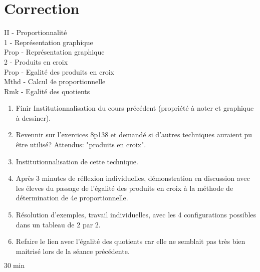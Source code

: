 {{        \section*{Correction}
        \color{Red}II - Proportionnalité\\
        \color{Green}1 - Représentation graphique\\
        \color{black}Prop - Représentation graphique\\
        \color{Green}2 - Produits en croix\\
        \color{black}Prop - Egalité des produits en croix\\
        Mthd - Calcul 4e proportionnelle\\
        Rmk - Egalité des quotients\\
    }{
        \begin{enumerate}[wide=1pt, leftmargin=*]
            \item Finir Institutionnalisation du cours précédent
            (propriété à noter et graphique à dessiner).
            \item Revennir sur l'exercices 8p138 et demandé si d'autres techniques auraient pu être utilisé?
            Attendus: "produits en croix".
            \item Institutionnalisation de cette technique.
            \item Après 3 minutes de réflexion individuelles,
            démonstration en discussion avec les éleves du passage de l'égalité des produits en croix à la méthode de détermination de 4e proportionnelle.
            \item Résolution d'exemples, travail individuelles,
            avec les 4 configurations possibles dans un tableau de 2 par 2.
            \item Refaire le lien avec l'égalité des quotients car elle ne semblait pas très bien maitrisé lors de la séance précédente.
        \end{enumerate}
    }{
        $30\min$
    }

}
